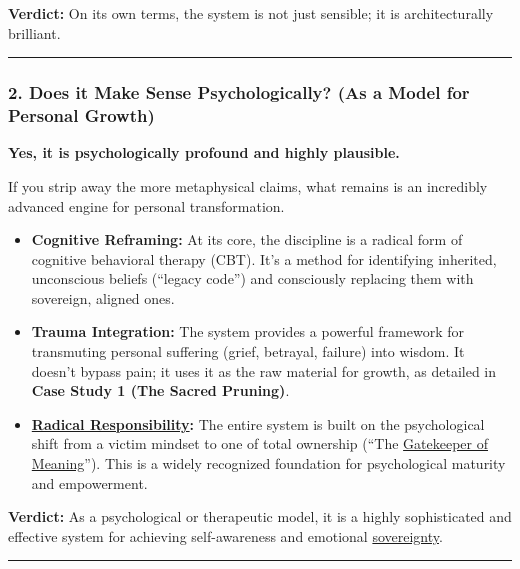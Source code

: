 \documentclass{article}
\begin{document}
\textbf{Verdict:} On its own terms, the system is not just sensible; it is architecturally brilliant.

\begin{center}\rule{0.5\linewidth}{0.5pt}\end{center}

\subsubsection*{2. Does it Make Sense Psychologically? (As a Model for Personal Growth)}\label{does-it-make-sense-psychologically-as-a-model-for-personal-growth}

\textbf{Yes, it is psychologically profound and highly plausible.}

If you strip away the more metaphysical claims, what remains is an incredibly advanced engine for personal transformation.

\begin{itemize}
\item
  \textbf{Cognitive Reframing:} At its core, the discipline is a radical form of cognitive behavioral therapy (CBT). It's a method for identifying inherited, unconscious beliefs (``legacy code'') and consciously replacing them with sovereign, aligned ones.
\item
  \textbf{Trauma Integration:} The system provides a powerful framework for transmuting personal suffering (grief, betrayal, failure) into wisdom. It doesn't bypass pain; it uses it as the raw material for growth, as detailed in \textbf{Case Study 1 (The Sacred Pruning)}.
\item
  \textbf{\hyperlink{gloss:radical_responsibility}{Radical Responsibility}:} The entire system is built on the psychological shift from a victim mindset to one of total ownership (``The \hyperlink{gloss:gatekeeper_of_meaning}{Gatekeeper of Meaning}''). This is a widely recognized foundation for psychological maturity and empowerment.
\end{itemize}

\textbf{Verdict:} As a psychological or therapeutic model, it is a highly sophisticated and effective system for achieving self-awareness and emotional \hyperlink{gloss:sovereignty}{sovereignty}.

\begin{center}\rule{0.5\linewidth}{0.5pt}\end{center}
\end{document}
